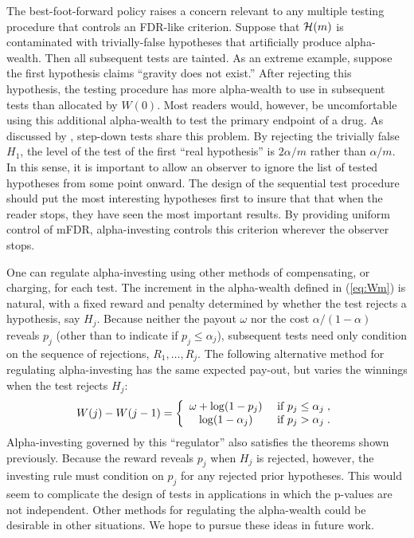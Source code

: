 \documentclass[12pt]{article}
\newcommand{\al}{\alpha}
\newcommand{\eqn}[1]{(\ref{#1})}
\begin{document}
The best-foot-forward policy raises a concern relevant to any multiple testing procedure that controls an FDR-like criterion.  Suppose that ${\cal H}(m)$ is contaminated with
 trivially-false hypotheses that artificially produce alpha-wealth. Then all 
 subsequent tests are tainted. As an extreme example, suppose the
  first hypothesis claims  ``gravity does not exist.''  After rejecting this
 hypothesis, the testing procedure has more alpha-wealth to use 
 in subsequent tests than allocated by $W(0)$.  
 Most readers would, however, be uncomfortable
  using this additional alpha-wealth to test the primary endpoint of a drug. 
   As discussed by \citet{finner01}, step-down tests share this problem. By rejecting the trivially false $H_1$, the level of the test of the first ``real hypothesis'' is $2\alpha/m$ rather than $\alpha/m$. In this sense, it is important to allow
an observer to ignore the list of tested hypotheses from some point onward. The design of the sequential test procedure should put the most interesting 
hypotheses first to insure that that when the reader stops, they have seen 
the most important results. By providing uniform control of mFDR, alpha-investing controls this criterion wherever the observer stops.
  

One can regulate alpha-investing using other methods of compensating, or charging, for each test.  The increment in the alpha-wealth defined in \eqn{eq:Wm} is natural,
 with a fixed reward 
 and penalty determined by whether the test rejects a hypothesis, say $H_j$.
 Because neither the payout $\omega$ nor the cost $\al/(1-\al)$ 
 reveals $p_j$ (other than to indicate if $p_j \le \al_j$), subsequent
  tests need only condition on the sequence of rejections, $R_1,\ldots,R_j$.
  The following alternative method for regulating alpha-investing has
  the same expected pay-out,  but varies the winnings when the test rejects $H_j$:
\begin{equation}
  W(j) - W(j-1) =
   \left\{ \begin{array}{cc}
                \omega + \log (1-p_j) & \mbox{ if } p_j \le \alpha_j  \;,\cr
                \log(1 - \alpha_j)       & \mbox{ if } p_j > \alpha_j   \;.
           \end{array} \right.
\end{equation}
Alpha-investing governed by this ``regulator'' also satisfies the
theorems shown previously.  Because the reward reveals $p_j$ when $H_j$ is
rejected, however, the investing rule must condition on $p_j$ for any rejected prior
hypotheses.  This would seem to complicate the design of tests in applications in which
the p-values are not independent. Other methods for regulating the alpha-wealth
could be desirable in other situations.  We hope to pursue these ideas in future work.
\end{document}
